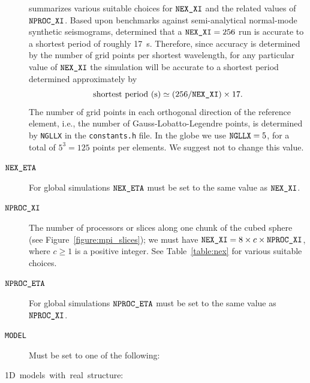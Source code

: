 \documentclass[oneside,english]{book}
\newcommand{\nexxi}{\mbox{\texttt{NEX\_XI}}}
\newcommand{\nexeta}{\mbox{\texttt{NEX\_ETA}}}
\newcommand{\nprocxi}{\mbox{\texttt{NPROC\_XI}}}
\newcommand{\nproceta}{\mbox{\texttt{NPROC\_ETA}}}
\begin{document}
\begin{description}
summarizes various suitable choices for $\nexxi$ and the related
values of $\nprocxi$. Based upon benchmarks against semi-analytical
normal-mode synthetic seismograms, \citet{KoTr02a,KoTr02b} determined
that a $\nexxi=256$ run is accurate to a shortest period of roughly
17~s. Therefore, since accuracy is determined by the number of grid
points per shortest wavelength, for any particular value of $\nexxi$
the simulation will be accurate to a shortest period determined approximately
by \begin{equation}
\mbox{shortest period (s)}\simeq(256/\nexxi)\times17.\label{eq:shortest_period}\end{equation}
 The number of grid points in each orthogonal direction of the reference
element, i.e., the number of Gauss-Lobatto-Legendre points, is determined
by \texttt{NGLLX} in the \texttt{constants.h} file. In the globe we
use $\mbox{\texttt{NGLLX}}=5$, for a total of $5^{3}=125$ points
per elements. We suggest not to change this value.
\item [{$\nexeta$}] For global simulations $\nexeta$ must be set to the
same value as $\nexxi$.
\item [{$\nprocxi$}] The number of processors or slices along one chunk
of the cubed sphere (see Figure~\ref{figure:mpi_slices}); we must
have $\nexxi=8\times c\times\nprocxi$, where $c\ge1$ is a positive
integer. See Table~\ref{table:nex} for various suitable choices.
\item [{$\nproceta$}] For global simulations $\nproceta$ must be set
to the same value as $\nprocxi$.
\item [{\texttt{MODEL}}] Must be set to one of the following:
\item [{\textmd{1D~models~with~real~structure:}}]~


\end{description}
\end{document}
